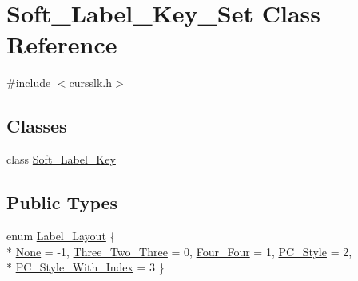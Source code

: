 \hypertarget{class_soft___label___key___set}{\section{Soft\-\_\-\-Label\-\_\-\-Key\-\_\-\-Set Class Reference}
\label{class_soft___label___key___set}
}


{\ttfamily \#include $<$cursslk.\-h$>$}

\subsection*{Classes}
\begin{DoxyCompactItemize}
\item 
class \hyperlink{class_soft___label___key___set_1_1_soft___label___key}{Soft\-\_\-\-Label\-\_\-\-Key}
\end{DoxyCompactItemize}
\subsection*{Public Types}
\begin{DoxyCompactItemize}
\item 
enum \hyperlink{class_soft___label___key___set_a4d68b5593db1c9c763e3916b2b6edaf6}{Label\-\_\-\-Layout} \{ \\*
\hyperlink{class_soft___label___key___set_a4d68b5593db1c9c763e3916b2b6edaf6a54bb3e10328bdb082d57c229c636a971}{None} = -\/1, 
\hyperlink{class_soft___label___key___set_a4d68b5593db1c9c763e3916b2b6edaf6abee5913d5e26c17a698bb75d1ccfa792}{Three\-\_\-\-Two\-\_\-\-Three} = 0, 
\hyperlink{class_soft___label___key___set_a4d68b5593db1c9c763e3916b2b6edaf6a468ba7f6ddf80c28999e414b6c5143f0}{Four\-\_\-\-Four} = 1, 
\hyperlink{class_soft___label___key___set_a4d68b5593db1c9c763e3916b2b6edaf6a92a1de06366cb84893a457f6f5888153}{P\-C\-\_\-\-Style} = 2, 
\\*
\hyperlink{class_soft___label___key___set_a4d68b5593db1c9c763e3916b2b6edaf6a78af73357aa034e9d488f7cf0c349857}{P\-C\-\_\-\-Style\-\_\-\-With\-\_\-\-Index} = 3
 \}
\end{DoxyCompactItemize}

